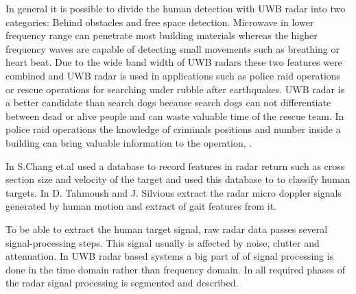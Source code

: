In general it is possible to divide the human detection with UWB radar into two categories: Behind obstacles and free space detection. Microwave in lower frequency range can penetrate most building materials whereas the higher frequency waves are capable of detecting small movements such as  breathing or heart beat. Due to the wide band width of UWB radars these two features were combined and UWB radar is used in applications such as police raid operations or rescue operations for searching under rubble after earthquakes. UWB radar is a better candidate than search dogs because search dogs can not differentiate between dead or alive people and can waste valuable time of the rescue team. In police raid operations the knowledge of criminals positions and number inside a building can bring valuable information to the operation\cite{trappedpeople}, \cite{ThroughWallHuman}. 

In\cite{SChangUWBHumanDetection} S.Chang et.al used a database to record features in radar return such as cross section size and velocity of the target and used this database to to classify human targets. In \cite{MicroDopplerGaitTahmoush} D. Tahmoush and J. Silvious extract the radar micro doppler signals generated by human motion and extract of gait features from it.

To be able to extract the human target signal, raw radar data passes several signal-processing steps. This signal usually is affected by noise, clutter and attenuation. In UWB radar based systems a big part of of signal processing is done in the time domain rather than frequency domain. In\cite{SignalProcessingSteps} all required phases of the radar signal processing is segmented and described.

